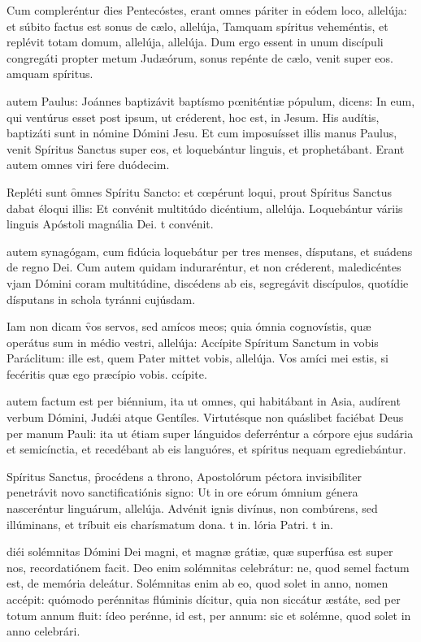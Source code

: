 \documentclass[fontsize=9pt,paper=A6,twoside,BCOR=1mm,DIV=22,headinclude]{scrarticle}
\begin{document}
\begin{multicols}{2}
\R Cum compleréntur \f dies Pentecóstes, erant omnes páriter in eódem loco, allelúja: et súbito factus est sonus de cælo, allelúja,
\red{*} Tamquam spíritus veheméntis, et replévit totam domum, allelúja, allelúja.
\V Dum ergo essent in unum discípuli congregáti propter metum Judæórum, sonus repénte de cælo, venit super eos.
amquam spíritus.

 autem Paulus: Joánnes baptizávit baptísmo pœniténtiæ pópulum, dicens: In eum, qui ventúrus esset post ipsum, ut créderent, hoc est, in Jesum. His audítis, baptizáti sunt in nómine Dómini Jesu. Et cum imposuísset illis manus Paulus, venit Spíritus Sanctus super eos, et loquebántur linguis, et prophetábant. Erant autem omnes viri fere duódecim. 

\R Repléti sunt \f omnes Spíritu Sancto: et cœpérunt loqui, prout Spíritus Sanctus dabat éloqui illis:
\red{*} Et convénit multitúdo dicéntium, allelúja.
\V Loquebántur váriis linguis Apóstoli magnália Dei.
t convénit.

 autem synagógam, cum fidúcia loquebátur per tres menses, dísputans, et suádens de regno Dei. Cum autem quidam induraréntur, et non créderent, maledicéntes vjam Dómini coram multitúdine, discédens ab eis, segregávit discípulos, quotídie dísputans in schola tyránni cujúsdam.

\R Iam non dicam \f vos servos, sed amícos meos; quia ómnia cognovístis, quæ operátus sum in médio vestri, allelúja:
\red{*} Accípite Spíritum Sanctum in vobis Paráclitum: ille est, quem Pater mittet vobis, allelúja.
\V Vos amíci mei estis, si fecéritis quæ ego præcípio vobis.
ccípite.

 autem factum est per biénnium, ita ut omnes, qui habitábant in Asia, audírent verbum Dómini, Jud\'æi atque Gentíles. Virtutésque non quáslibet faciébat Deus per manum Pauli: ita ut étiam super lánguidos deferréntur a córpore ejus sudária et semicínctia, et recedébant ab eis languóres, et spíritus nequam egrediebántur.

\R Spíritus Sanctus, \f procédens a throno, Apostolórum péctora invisibíliter penetrávit novo sanctificatiónis signo:
\red{*} Ut in ore eórum ómnium génera nasceréntur linguárum, allelúja.
\V Advénit ignis divínus, non combúrens, sed illúminans, et tríbuit eis charísmatum dona.
t in.
lória Patri.
t in.

 diéi solémnitas Dómini Dei magni, et magnæ grátiæ, quæ superfúsa est super nos, recordatiónem facit. Deo enim solémnitas celebrátur: ne, quod semel factum est, de memória deleátur. Solémnitas enim ab eo, quod solet in anno, nomen accépit: quómodo perénnitas flúminis dícitur, quia non siccátur æstáte, sed per totum annum fluit: ídeo perénne, id est, per annum: sic et solémne, quod solet in anno celebrári.


\end{multicols}
\end{document}

